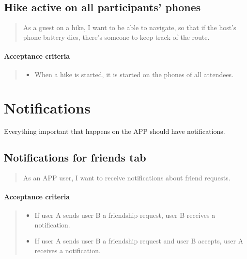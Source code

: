 \subsection{Hike active on all participants' phones}\label{US:friends-hike-active}
\begin{quote}
As a guest on a hike, I want to be able to navigate, so that if the host's phone battery dies, there's someone to keep track of the route.
\end{quote}

\paragraph*{Acceptance criteria}
\begin{quote}
\begin{itemize}
    \item When a hike is started, it is started on the phones of all attendees.
\end{itemize}
\end{quote}


\section{Notifications}\label{epic:notif}
Everything important that happens on the APP should have notifications.

\subsection{Notifications for friends tab}
\begin{quote}
As an APP user, I want to receive notifications about friend requests.
\end{quote}

\paragraph*{Acceptance criteria}
\begin{quote}
\begin{itemize}
    \item If user A sends user B a friendship request, user B receives a notification.
    \item If user A sends user B a friendship request and user B accepts, user A receives a notification.
\end{itemize}
\end{quote}

